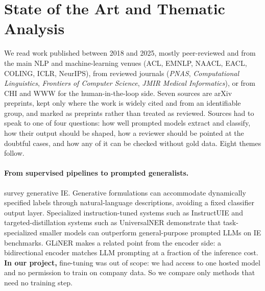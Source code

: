 \section{State of the Art and Thematic Analysis}
\label{sec:related}

We read work published between 2018 and 2025, mostly peer-reviewed and from the
main NLP and machine-learning venues (ACL, EMNLP, NAACL, EACL, COLING, ICLR,
NeurIPS), from reviewed journals (\emph{PNAS}, \emph{Computational
Linguistics}, \emph{Frontiers of Computer Science}, \emph{JMIR Medical
Informatics}), or from CHI and WWW for the human-in-the-loop side. Seven sources
are arXiv preprints, kept only where the work is widely cited and from an
identifiable group, and marked as preprints rather than treated as reviewed.
Sources had to speak to one of four questions: how well prompted models extract
and classify, how their output should be shaped, how a reviewer should be
pointed at the doubtful cases, and how any of it can be checked without gold
data. Eight themes follow.

\paragraph{From supervised pipelines to prompted generalists.}
\citet{xu2024generative} survey generative IE. Generative formulations can
accommodate dynamically specified labels through natural-language descriptions,
avoiding a fixed classifier output layer. Specialized instruction-tuned systems
such as InstructUIE \citep{wang2023instructuie} and targeted-distillation systems
such as UniversalNER \citep{zhou2024universalner} demonstrate that
task-specialized smaller models can outperform general-purpose prompted LLMs on
IE benchmarks. GLiNER \citep{zaratiana2024gliner} makes a related point from the
encoder side: a bidirectional encoder matches LLM prompting at a fraction of
the inference cost.
\textbf{In our project,} fine-tuning was out of scope: we had access to one
hosted model and no permission to train on company data. So we compare only
methods that need no training step.

